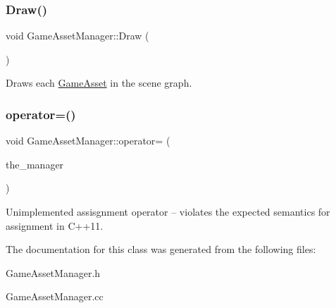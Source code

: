 \subsubsection{\texorpdfstring{Draw()}{Draw()}}
{\footnotesize\ttfamily void Game\+Asset\+Manager\+::\+Draw (\begin{DoxyParamCaption}{ }\end{DoxyParamCaption})}

Draws each \hyperlink{classGameAsset}{Game\+Asset} in the scene graph. \mbox{\label{classGameAssetManager_ac72678a4ad5378c685aa6bae84a4e712}} 
\subsubsection{\texorpdfstring{operator=()}{operator=()}}
{\footnotesize\ttfamily void Game\+Asset\+Manager\+::operator= (\begin{DoxyParamCaption}\item[{\hyperlink{classGameAssetManager}{Game\+Asset\+Manager} const \&}]{the\+\_\+manager }\end{DoxyParamCaption})}

Unimplemented assisgnment operator -- violates the expected semantics for assignment in C++11. 

The documentation for this class was generated from the following files\+:\begin{DoxyCompactItemize}
\item 
Game\+Asset\+Manager.\+h\item 
Game\+Asset\+Manager.\+cc\end{DoxyCompactItemize}
